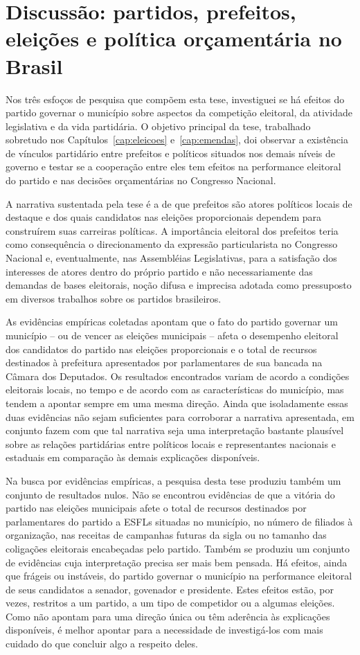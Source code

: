 \chapter*{Discussão: partidos, prefeitos, eleições e política orçamentária no Brasil}
\label{cap:conclusao}

Nos três esfoços de pesquisa que compõem esta tese, investiguei se há efeitos do partido governar o município sobre aspectos da competição eleitoral, da atividade legislativa e da vida partidária. O objetivo principal da tese, trabalhado sobretudo nos Capítulos~\ref{cap:eleicoes} e~\ref{cap:emendas}, doi observar a existência de vínculos partidário entre prefeitos e políticos situados nos demais níveis de governo e testar se a cooperação entre eles tem efeitos na performance eleitoral do partido e nas decisões orçamentárias no Congresso Nacional.

A narrativa sustentada pela tese é a de que prefeitos são atores políticos locais de destaque e dos quais candidatos nas eleições proporcionais dependem para construírem suas carreiras políticas. A importância eleitoral dos prefeitos teria como consequência o direcionamento da expressão particularista no Congresso Nacional e, eventualmente, nas Assembléias Legislativas, para a satisfação dos interesses de atores dentro do próprio partido e não necessariamente das demandas de bases eleitorais, noção difusa e imprecisa adotada como pressuposto em diversos trabalhos sobre os partidos brasileiros.

As evidências empíricas coletadas apontam que o fato do partido governar um município -- ou de vencer as eleições municipais -- afeta o desempenho eleitoral dos candidatos do partido nas eleições proporcionais e o total de recursos destinados à prefeitura apresentados por parlamentares de sua bancada na Câmara dos Deputados. Os resultados encontrados variam de acordo a condições eleitorais locais, no tempo e de acordo com as características do município, mas tendem a apontar sempre em uma mesma direção. Ainda que isoladamente essas duas evidências não sejam suficientes para corroborar a narrativa apresentada, em conjunto fazem com que tal narrativa seja uma interpretação bastante plausível sobre as relações partidárias entre políticos locais e representantes nacionais e estaduais em comparação às demais explicações disponíveis.

Na busca por evidências empíricas, a pesquisa desta tese produziu também um conjunto de resultados nulos. Não se encontrou evidências de que a vitória do partido nas eleições municipais afete o total de recursos destinados por parlamentares do partido a ESFLs situadas no município, no número de filiados à organização, nas receitas de campanhas futuras da sigla ou no tamanho das coligações eleitorais encabeçadas pelo partido. Também se produziu um conjunto de evidências cuja interpretação precisa ser mais bem pensada. Há efeitos, ainda que frágeis ou instáveis, do partido governar o município na performance eleitoral de seus candidatos a senador, govenador e presidente. Estes efeitos estão, por vezes, restritos a um partido, a um tipo de competidor ou a algumas eleições. Como não apontam para uma direção única ou têm aderência às explicações disponíveis, é melhor apontar para a necessidade de investigá-los com mais cuidado do que concluir algo a respeito deles.
